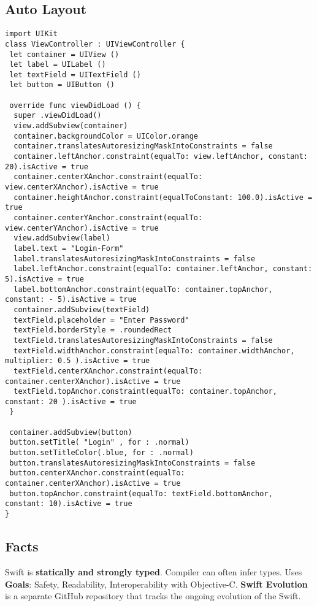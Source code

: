 \subsection{Auto Layout}
\begin{lstlisting}
import UIKit
class ViewController : UIViewController {
 let container = UIView ()
 let label = UILabel ()
 let textField = UITextField ()
 let button = UIButton ()

 override func viewDidLoad () {
  super .viewDidLoad()
  view.addSubview(container)
  container.backgroundColor = UIColor.orange
  container.translatesAutoresizingMaskIntoConstraints = false
  container.leftAnchor.constraint(equalTo: view.leftAnchor, constant: 20).isActive = true
  container.centerXAnchor.constraint(equalTo: view.centerXAnchor).isActive = true
  container.heightAnchor.constraint(equalToConstant: 100.0).isActive = true
  container.centerYAnchor.constraint(equalTo: view.centerYAnchor).isActive = true
  view.addSubview(label)
  label.text = "Login-Form"
  label.translatesAutoresizingMaskIntoConstraints = false
  label.leftAnchor.constraint(equalTo: container.leftAnchor, constant: 5).isActive = true
  label.bottomAnchor.constraint(equalTo: container.topAnchor, constant: - 5).isActive = true
  container.addSubview(textField)
  textField.placeholder = "Enter Password"
  textField.borderStyle = .roundedRect
  textField.translatesAutoresizingMaskIntoConstraints = false
  textField.widthAnchor.constraint(equalTo: container.widthAnchor, multiplier: 0.5 ).isActive = true
  textField.centerXAnchor.constraint(equalTo: container.centerXAnchor).isActive = true
  textField.topAnchor.constraint(equalTo: container.topAnchor, constant: 20 ).isActive = true
 }

 container.addSubview(button)
 button.setTitle( "Login" , for : .normal)
 button.setTitleColor(.blue, for : .normal)
 button.translatesAutoresizingMaskIntoConstraints = false
 button.centerXAnchor.constraint(equalTo: container.centerXAnchor).isActive = true
 button.topAnchor.constraint(equalTo: textField.bottomAnchor, constant: 10).isActive = true
}
\end{lstlisting}

\subsection{Facts}
Swift is \textbf{statically and strongly typed}. Compiler can often infer
types. Uses \textbf{Goals}: Safety, Readability, Interoperability with Objective-C.
\textbf{Swift Evolution} is a separate GitHub repository that tracks the
ongoing evolution of the Swift.

